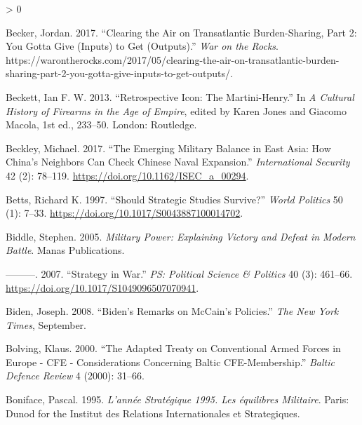 \documentclass[
]{article}
\newlength{\cslhangindent}
\newenvironment{CSLReferences}[2] %
 {%
  \setlength{\parindent}{0pt}
  \ifodd #1 \everypar{\setlength{\hangindent}{\cslhangindent}}\ignorespaces\fi
  \ifnum #2 > 0
  \setlength{\parskip}{#2\baselineskip}
  \fi
 }%
 {}
\begin{document}
\begin{CSLReferences}{1}{0}
\leavevmode\hypertarget{ref-becker_clearingairtransatlantic_2017}{}%
Becker, Jordan. 2017. {``Clearing the {Air} on {Transatlantic Burden}-{Sharing}, {Part} 2: {You Gotta Give} ({Inputs}) to {Get} ({Outputs}).''} \emph{War on the Rocks}. https://warontherocks.com/2017/05/clearing-the-air-on-transatlantic-burden-sharing-part-2-you-gotta-give-inputs-to-get-outputs/.

\leavevmode\hypertarget{ref-beckett_retrospectiveiconmartinihenry_2013}{}%
Beckett, Ian F. W. 2013. {``Retrospective {Icon}: {The Martini}-{Henry}.''} In \emph{A {Cultural History} of {Firearms} in the {Age} of {Empire}}, edited by Karen Jones and Giacomo Macola, 1st ed., 233--50. {London}: {Routledge}.

\leavevmode\hypertarget{ref-beckley_emergingmilitarybalance_2017}{}%
Beckley, Michael. 2017. {``The {Emerging Military Balance} in {East Asia}: {How China}'s {Neighbors Can Check Chinese Naval Expansion}.''} \emph{International Security} 42 (2): 78--119. \url{https://doi.org/10.1162/ISEC_a_00294}.

\leavevmode\hypertarget{ref-betts_shouldstrategicstudies_1997}{}%
Betts, Richard K. 1997. {``Should {Strategic Studies Survive}?''} \emph{World Politics} 50 (1): 7--33. \url{https://doi.org/10.1017/S0043887100014702}.

\leavevmode\hypertarget{ref-biddle_militarypowerexplaining_2005}{}%
Biddle, Stephen. 2005. \emph{Military {Power}: {Explaining Victory} and {Defeat} in {Modern Battle}}. {Manas Publications}.

\leavevmode\hypertarget{ref-biddle_strategywar_2007}{}%
---------. 2007. {``Strategy in {War}.''} \emph{PS: Political Science \& Politics} 40 (3): 461--66. \url{https://doi.org/10.1017/S1049096507070941}.

\leavevmode\hypertarget{ref-biden_bidenremarksmccain_2008}{}%
Biden, Joseph. 2008. {``Biden's {Remarks} on {McCain}'s {Policies}.''} \emph{The New York Times}, September.

\leavevmode\hypertarget{ref-bolving_adaptedtreatyconventional_2000}{}%
Bolving, Klaus. 2000. {``The {Adapted Treaty} on {Conventional Armed Forces} in {Europe} - {CFE} - {Considerations} Concerning {Baltic CFE}-{Membership}.''} \emph{Baltic Defence Review} 4 (2000): 31--66.

\leavevmode\hypertarget{ref-boniface_anneestrategique1995_1995}{}%
Boniface, Pascal. 1995. \emph{L'année {Stratégique} 1995. {Les} équilibres Militaire}. {Paris}: {Dunod for the Institut des Relations Internationales et Strategiques}.


\end{CSLReferences}
\end{document}
